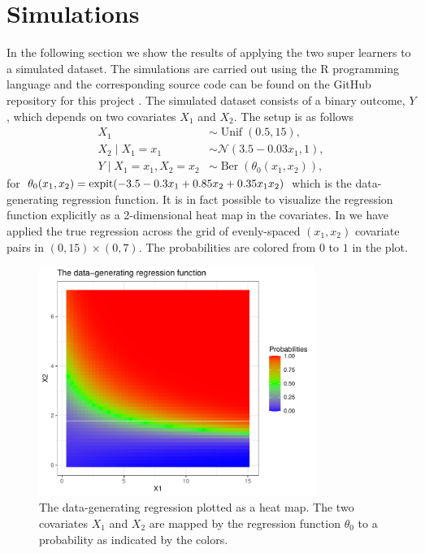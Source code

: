 \documentclass[./main.tex]{subfiles}
\begin{document}
\section{Simulations} \label{sec:simulations}
In the following section we show the results of applying the two super learners to a simulated dataset. The simulations are carried out using the R programming language and the corresponding source code can be found on the GitHub repository for this project \parencite{github}. The simulated dataset consists of a binary outcome, $Y$, which depends on two covariates $X_1$ and $X_2$. The setup is as follows
\begin{align*}
    X_1 &\sim \operatorname{Unif}(0.5, 15),\\
    X_2 \mid X_1 = x_1 &\sim \mathcal{N}(3.5-0.03x_1, 1),\\
    Y \mid X_1 = x_1, X_2 = x_2 &\sim \operatorname{Ber}(\theta_0(x_1, x_2)),
\end{align*}
for $\theta_0(x_1, x_2) = \operatorname{expit}({-3.5 - 0.3x_1 + 0.85x_2 + 0.35x_1x_2})$ which is the data-generating regression function. It is in fact possible to visualize the regression function explicitly as a 2-dimensional heat map in the covariates. In  we have applied the true regression across the grid of evenly-spaced $ (x_1, x_2) $ covariate pairs in $ (0, 15) \times (0,7) $. The probabilities are colored from $ 0 $ to $ 1 $ in the plot. 
\begin{figure}[H]
    \centering
    \includegraphics[width=0.8\textwidth]{figures/trueplot.pdf}
    \caption{The data-generating regression plotted as a heat map. The two covariates $ X_1 $ and $ X_2 $ are mapped by the regression function $ \theta_0 $ to a probability as indicated by the colors.}
    \label{fig:trueplot}
\end{figure}
\end{document}
